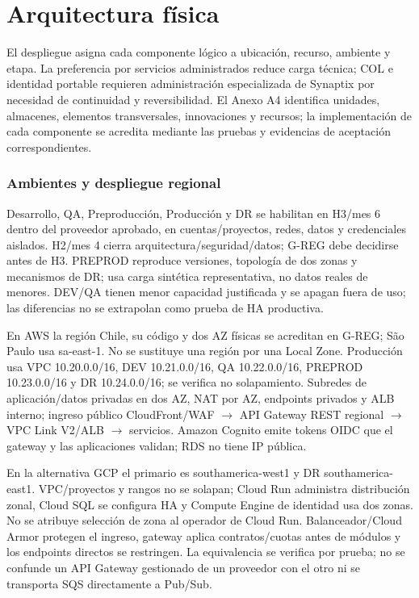 \documentclass[11pt,letterpaper]{report}
\begin{document}
\section{Arquitectura física}
El despliegue asigna cada componente lógico a ubicación, recurso, ambiente y etapa. La preferencia por servicios administrados reduce carga técnica; COL e identidad portable requieren administración especializada de Synaptix por necesidad de continuidad y reversibilidad. El Anexo A4 identifica unidades, almacenes, elementos transversales, innovaciones y recursos; la implementación de cada componente se acredita mediante las pruebas y evidencias de aceptación correspondientes.

\subsubsection*{Ambientes y despliegue regional}
Desarrollo, QA, Preproducción, Producción y DR se habilitan en H3/mes 6 dentro del proveedor aprobado, en cuentas/proyectos, redes, datos y credenciales aislados. H2/mes 4 cierra arquitectura/seguridad/datos; G-REG debe decidirse antes de H3. PREPROD reproduce versiones, topología de dos zonas y mecanismos de DR; usa carga sintética representativa, no datos reales de menores. DEV/QA tienen menor capacidad justificada y se apagan fuera de uso; las diferencias no se extrapolan como prueba de HA productiva.

En AWS la región Chile, su código y dos AZ físicas se acreditan en G-REG; São Paulo usa sa-east-1. No se sustituye una región por una Local Zone. Producción usa VPC 10.20.0.0/16, DEV 10.21.0.0/16, QA 10.22.0.0/16, PREPROD 10.23.0.0/16 y DR 10.24.0.0/16; se verifica no solapamiento. Subredes de aplicación/datos privadas en dos AZ, NAT por AZ, endpoints privados y ALB interno; ingreso público CloudFront/WAF $\rightarrow$ API Gateway REST regional $\rightarrow$ VPC Link V2/ALB $\rightarrow$ servicios. Amazon Cognito emite tokens OIDC que el gateway y las aplicaciones validan; RDS no tiene IP pública.

En la alternativa GCP el primario es southamerica-west1 y DR southamerica-east1. VPC/proyectos y rangos no se solapan; Cloud Run administra distribución zonal, Cloud SQL se configura HA y Compute Engine de identidad usa dos zonas. No se atribuye selección de zona al operador de Cloud Run. Balanceador/Cloud Armor protegen el ingreso, gateway aplica contratos/cuotas antes de módulos y los endpoints directos se restringen. La equivalencia se verifica por prueba; no se confunde un API Gateway gestionado de un proveedor con el otro ni se transporta SQS directamente a Pub/Sub.
\end{document}
